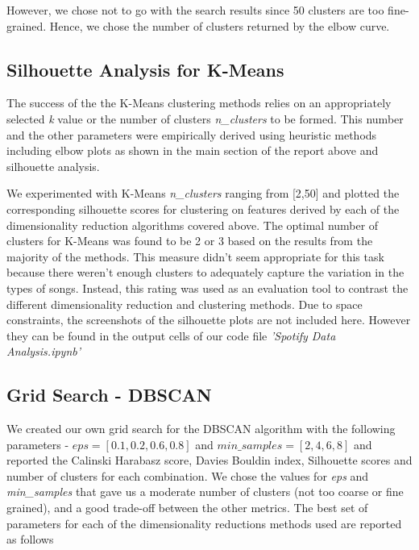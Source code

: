 \begin{appendix}
However, we chose not to go with the search results since 50 clusters are too fine-grained. Hence, we chose the number of clusters returned by the elbow curve.

\subsection{Silhouette Analysis for K-Means}
The success of the the K-Means clustering methods relies on an appropriately selected \textit{k} value or the number of clusters \textit{n\_clusters} to be formed. This number and the other parameters were empirically derived using heuristic methods including elbow plots as shown in the main section of the report above and silhouette analysis.

We experimented with K-Means \textit{n\_clusters} ranging from [2,50] and plotted the corresponding silhouette scores for clustering on features derived by each of the dimensionality reduction algorithms covered above. The optimal number of clusters for K-Means was found to be 2 or 3 based on the results from the majority of the methods. This measure didn't seem appropriate for this task because there weren't enough clusters to adequately capture the variation in the types of songs. Instead, this rating was used as an evaluation tool to contrast the different dimensionality reduction and clustering methods. Due to space constraints, the screenshots of the silhouette plots are not included here. However they can be found in the output cells of our code file \textit{'Spotify Data Analysis.ipynb'}

\subsection{Grid Search - DBSCAN}
We created our own grid search for the DBSCAN algorithm with the following parameters - $eps = [0.1, 0.2, 0.6, 0.8]$ and $min\_samples = [2, 4, 6, 8]$ and reported the Calinski Harabasz score, Davies Bouldin index, Silhouette scores and number of clusters for each combination. We chose the values for \textit{eps} and \textit{min\_samples} that gave us a moderate number of clusters (not too coarse or fine grained), and a good trade-off between the other metrics.
The best set of parameters for each of the dimensionality reductions methods used are reported as follows


\end{appendix}
